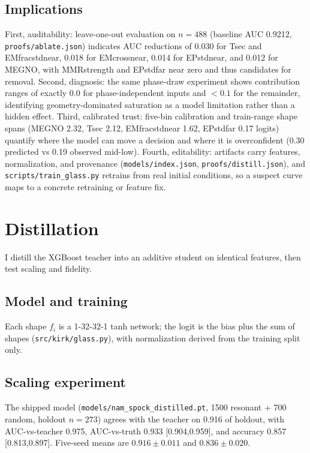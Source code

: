 \documentclass[11pt]{article}
\begin{document}
\subsection{Implications}
First, auditability: leave-one-out evaluation on $n=488$ (baseline AUC 0.9212, \texttt{proofs/ablate.json}) indicates AUC reductions of 0.030 for Tsec and EMfracstdnear, 0.018 for EMcrossnear, 0.014 for EPstdnear, and 0.012 for MEGNO, with MMRstrength and EPstdfar near zero and thus candidates for removal. Second, diagnosis: the same phase-draw experiment shows contribution ranges of exactly 0.0 for phase-independent inputs and $<0.1$ for the remainder, identifying geometry-dominated saturation as a model limitation rather than a hidden effect. Third, calibrated trust: five-bin calibration and train-range shape spans (MEGNO 2.32, Tsec 2.12, EMfracstdnear 1.62, EPstdfar 0.17 logits) quantify where the model can move a decision and where it is overconfident (0.30 predicted vs 0.19 observed mid-low). Fourth, editability: artifacts carry features, normalization, and provenance (\texttt{models/index.json}, \texttt{proofs/distill.json}), and \texttt{scripts/train\_glass.py} retrains from real initial conditions, so a suspect curve maps to a concrete retraining or feature fix.

\section{Distillation}
I distill the XGBoost teacher into an additive student on identical features, then test scaling and fidelity.
\subsection{Model and training}
Each shape $f_i$ is a 1-32-32-1 tanh network; the logit is the bias plus the sum of shapes (\texttt{src/kirk/glass.py}), with normalization derived from the training split only.
\subsection{Scaling experiment}
The shipped model (\texttt{models/nam\_spock\_distilled.pt}, 1500 resonant + 700 random, holdout $n=273$) agrees with the teacher on 0.916 of holdout, with AUC-vs-teacher 0.975, AUC-vs-truth 0.933 [0.904,0.959], and accuracy 0.857 [0.813,0.897]. Five-seed means are $0.916\pm0.011$ and $0.836\pm0.020$.
\end{document}
